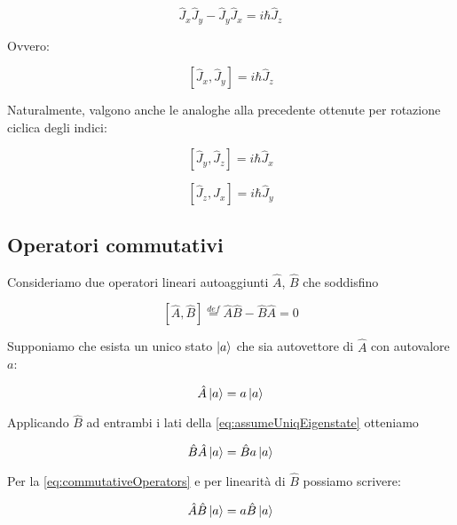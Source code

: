 	\begin{equation}
		\hat{J}_x \hat{J}_y - \hat{J}_y \hat{J}_x = i \hbar \hat{J}_z
	\end{equation}

Ovvero:

	\begin{equation}
		\left [ \hat{J}_x, \hat{J}_y \right ] = i \hbar \hat{J}_z
	\end{equation}

Naturalmente, valgono anche le analoghe alla precedente ottenute per rotazione ciclica degli indici:

	\begin{equation}
		\left [ \hat{J}_y, \hat{J}_z \right ] = i \hbar \hat{J}_x
	\end{equation}

	\begin{equation}
		\left [ \hat{J}_z, \hat{J}_x \right ] = i \hbar \hat{J}_y
	\end{equation}

\subsection{Operatori commutativi}

Consideriamo due operatori lineari autoaggiunti $\hat{A}$, $\hat{B}$ che soddisfino

	\begin{equation} \label{eq:commutativeOperators}
		\left [ \hat{A}, \hat{B} \right ] \overset{def}{=} \hat{A}\hat{B} - \hat{B}\hat{A} = 0
	\end{equation}

Supponiamo che esista un unico stato $\ket{a}$ che sia autovettore di $\hat{A}$ con autovalore $a$:

	\begin{equation} \label{eq:assumeUniqEigenstate}
		\hat{A}\ket{a} = a \ket{a}
	\end{equation}

Applicando $\hat{B}$ ad entrambi i lati della \eqref{eq:assumeUniqEigenstate} otteniamo

	\begin{equation}
		\hat{B}\hat{A}\ket{a} = \hat{B}a\ket{a}
	\end{equation}

Per la \eqref{eq:commutativeOperators} e per linearit\`a di $\hat{B}$ possiamo scrivere:

	\begin{equation}
		\hat{A}\hat{B} \ket{a} = a \hat{B} \ket{a}
	\end{equation}

